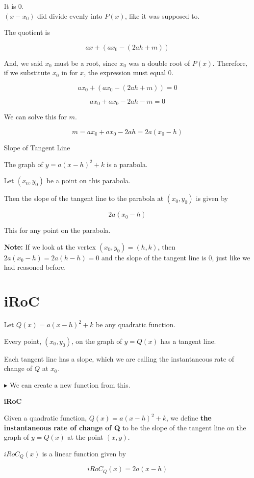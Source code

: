\documentclass{ximera}
\begin{document}
It is $0$.   \\


$(x - x_0)$ did divide evenly into $P(x)$, like it was supposed to.

The quotient is 


\[
a x + (a x_0 - (2 a h + m))
\]

And, we said $x_0$ must be a root, since $x_0$ was a double root of $P(x)$.  Therefore, if we substitute $x_0$ in for $x$, the expression must equal $0$.


\[
a x_0 + (a x_0 - (2 a h + m)) = 0
\]


\[
a x_0 + a x_0 - 2 a h - m = 0
\] 


We can solve this for $m$.



\[
m = a x_0 + a x_0 - 2 a h = 2 a (x_0 - h)
\] 



\begin{conclusion} Slope of Tangent Line


The graph of $y = a (x - h)^2 + k$ is a parabola.

Let $(x_0, y_0)$ be a point on this parabola.

Then the slope of the tangent line to the parabola at $(x_0, y_0)$ is given by 



\[ 2 a (x_0 - h) \]


\end{conclusion}
This for any point on the parabola.


\textbf{Note:} If we look at the vertex $(x_0, y_0) = (h, k)$, then $2 a (x_0 - h) = 2 a (h - h) = 0$ and the slope of the tangent line is $0$, just like we had reasoned before.





\section{iRoC}

Let $Q(x) = a (x - h)^2 + k$ be any quadratic function.

Every point, $(x_0, y_0)$, on the graph of $y = Q(x)$ has a tangent line.

Each tangent line has a slope, which we are calling the instantaneous rate of change of $Q$ at $x_0$.


$\blacktriangleright$ We can create a new function from this.



\begin{definition} \textbf{\textcolor{green!50!black}{iRoC}}  


Given a quadratic function, $Q(x) = a (x - h)^2 + k$, we define \textbf{the instantaneous rate of change of Q} to be the slope of the tangent line on the graph of $y = Q(x)$ at the point $(x, y)$.

$iRoC_Q(x)$ is a linear function given by 

\[  iRoC_Q(x) = 2 a (x-h) \]

\end{definition}
\end{document}

